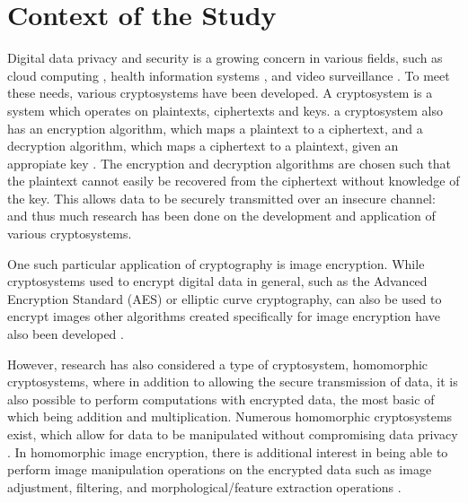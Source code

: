 
\section{Context of the Study}

Digital data privacy and security is a growing concern in various fields, such as  cloud computing \cite{potey_homomorphic_2016}, health information systems \cite{kester_cryptographic_2015}, and video surveillance \cite{upmanyu_efficient_2009}. To meet these needs, various cryptosystems have been developed. A cryptosystem is a system which operates on plaintexts, ciphertexts and keys. a cryptosystem also has an encryption algorithm, which maps a plaintext to a ciphertext, and a decryption algorithm, which maps a ciphertext to a plaintext, given an appropiate key \cite[p.119]{tilborg_encyclopedia_2005}. The encryption and decryption algorithms are chosen such that the plaintext cannot easily be recovered from the ciphertext without knowledge of the key. This allows data to be securely transmitted over an insecure channel:  and thus much research has been done on the development and application of various cryptosystems.

One such particular application of cryptography is image encryption. While cryptosystems used to encrypt digital data in general, such as the Advanced Encryption Standard (AES) or elliptic curve cryptography, can also be used to encrypt images \cite{jain_image_2016, singh_image_2015} other algorithms created specifically for image encryption have also been developed \cite{murugan_survey_2018}.

However, research has also considered a type of cryptosystem, homomorphic cryptosystems, where in addition to allowing the secure transmission of data, it is also possible to perform computations with encrypted data, the most basic of which being addition and multiplication. Numerous homomorphic cryptosystems exist, which allow for data to be manipulated without compromising data privacy \cite{fontaine_survey_2007, sen_homomorphic_2013}. In homomorphic image encryption, there is additional interest in being able to perform image manipulation operations on the encrypted data such as image adjustment, filtering, and morphological/feature extraction operations \cite{ziad_cryptoimg:_2016, gonzalez_digital_2008}.
